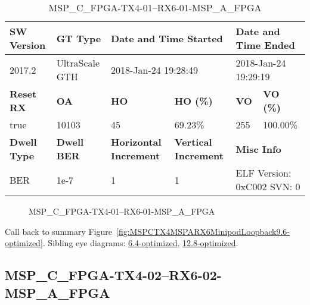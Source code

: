 \begin{table}[h]
\centering
\caption{MSP\_C\_FPGA-TX4-01--RX6-01-MSP\_A\_FPGA}
\label{tab:MSPCFPGATX401RX601MSPAFPGA9.6-optimized}
\begin{tabular}{@{}|l|l|l|l|l|l|@{}}
\toprule
\textbf{SW Version}                & \textbf{GT Type}   & \multicolumn{2}{l|}{\textbf{Date and Time Started}}            & \multicolumn{2}{l|}{\textbf{Date and Time Ended}}        \\ \midrule
2017.2                       & UltraScale GTH          & \multicolumn{2}{l|}{2018-Jan-24 19:28:49}                   & \multicolumn{2}{l|}{2018-Jan-24 19:29:19}               \\ \midrule
\textbf{Reset RX}                  & \textbf{OA} & \textbf{HO}   & \textbf{HO (\%)} & \textbf{VO} & \textbf{VO (\%)} \\ \midrule
true & 10103        & 45          & 69.23\%        & 255        & 100.00\%       \\ \midrule
\textbf{Dwell Type}                & \textbf{Dwell BER} & \textbf{Horizontal Increment} & \textbf{Vertical Increment}    & \multicolumn{2}{l|}{\textbf{Misc Info}}                  \\ \midrule
BER                            & 1e-7        & 1        & 1           & \multicolumn{2}{l|}{ELF Version: 0xC002 SVN: 0}                         \\ \bottomrule
\end{tabular}
\end{table}

\begin{figure}[h]
\caption{MSP\_C\_FPGA-TX4-01--RX6-01-MSP\_A\_FPGA} \label{fig:MSPCFPGATX401RX601MSPAFPGA9.6-optimized}
\end{figure}

Call back to summary Figure~\ref{fig:MSPCTX4MSPARX6MinipodLoopback9.6-optimized}.
Sibling eye diagrams: \hyperref[sec:MSPCFPGATX401RX601MSPAFPGA6.4-optimized]{6.4-optimized}, \hyperref[sec:MSPCFPGATX401RX601MSPAFPGA12.8-optimized]{12.8-optimized}.

\clearpage
\newpage


\subsection{MSP\_C\_FPGA-TX4-02--RX6-02-MSP\_A\_FPGA}\label{sec:MSPCFPGATX402RX602MSPAFPGA9.6-optimized}

